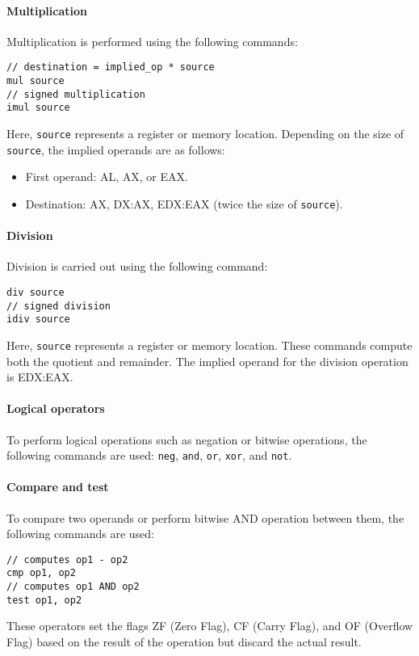 \paragraph*{Multiplication}
Multiplication is performed using the following commands:
\begin{verbatim}
// destination = implied_op * source
mul source
// signed multiplication
imul source
\end{verbatim}
Here, \texttt{source} represents a register or memory location.
Depending on the size of \texttt{source}, the implied operands are as follows:
\begin{itemize}
    \item First operand: AL, AX, or EAX.
    \item Destination: AX, DX:AX, EDX:EAX (twice the size of \texttt{source}).
\end{itemize}

\paragraph*{Division}
Division is carried out using the following command:
\begin{verbatim}
div source
// signed division
idiv source
\end{verbatim}
Here, \texttt{source} represents a register or memory location. 
These commands compute both the quotient and remainder. 
The implied operand for the division operation is EDX:EAX.

\paragraph*{Logical operators}
To perform logical operations such as negation or bitwise operations, the following commands are used: \texttt{neg}, \texttt{and}, \texttt{or}, \texttt{xor}, and \texttt{not}.

\paragraph*{Compare and test}
To compare two operands or perform bitwise AND operation between them, the following commands are used:
\begin{verbatim}
// computes op1 - op2
cmp op1, op2
// computes op1 AND op2
test op1, op2
\end{verbatim}
These operators set the flags ZF (Zero Flag), CF (Carry Flag), and OF (Overflow Flag) based on the result of the operation but discard the actual result.

